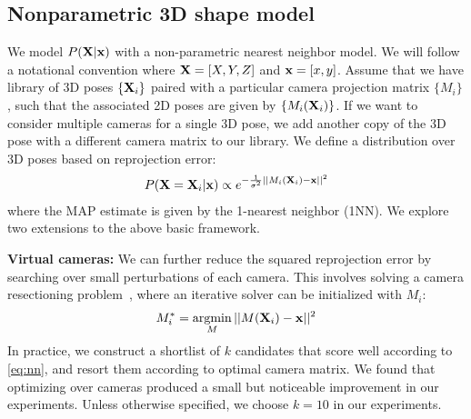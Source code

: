 \documentclass[10pt,twocolumn,letterpaper]{article}
\DeclareMathOperator*{\argmin}{argmin}
\begin{document}
\subsection{Nonparametric 3D shape model} \label{nn}
We model $P({\bf X}|{\bf x})$ with a non-parametric nearest neighbor model. We will follow a notational convention where ${\bf X} = [X,Y,Z]$ and ${\bf x} = [x,y]$. Assume that we have library of 3D poses $\{{\bf X}_i\}$ paired with a particular camera projection matrix $\{M_i\}$, such that the associated 2D poses are given by $\{M_i({\bf X}_i)\}$. If we want to consider multiple cameras for a single 3D pose, we add another copy of the 3D pose with a different camera matrix to our library. We define a distribution over 3D poses based on reprojection error:
\begin{align}
    P({\bf X} = {\bf X}_i|{\bf x}) \propto e^{-\frac{1}{\sigma^2}||M_i({\bf X}_i) - {\bf x}||^2} \label{eq:nn}
\end{align}
\noindent where the MAP estimate is given by the 1-nearest neighbor (1NN).  We explore two extensions to the above basic framework.

{\bf Virtual cameras:} We can further reduce the squared reprojection error by searching over small perturbations of each camera. This involves solving a camera resectioning problem~\cite{hartley2003multiple}, where an iterative solver can be initialized with $M_i$:
\begin{align}
M_i^* = \argmin_M ||M({\bf X}_i) - {\bf x}||^2 \label{eq:view}
\end{align}
In practice, we construct a shortlist of $k$ candidates that score well according to \eqref{eq:nn}, and resort them according to optimal camera matrix. We found that optimizing over cameras produced a small but noticeable improvement in our experiments. Unless otherwise specified, we choose $k=10$ in our experiments.
\end{document}
